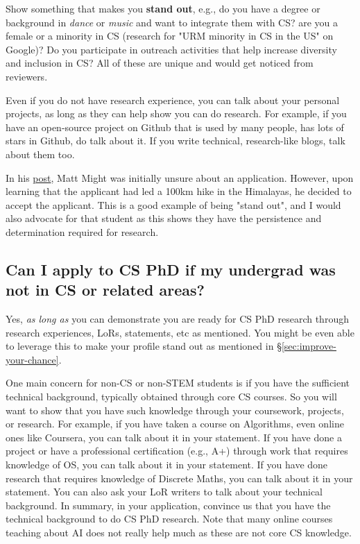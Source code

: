 \documentclass[11pt]{article}
\begin{document}
 Show something that makes you \textbf{stand out}, e.g., do you have a degree or background in \emph{dance} or \emph{music} and want to integrate them with CS? are you a female or a minority in CS (research for "URM minority in CS in the US" on Google)? Do you participate in outreach activities that help increase diversity and inclusion in CS? All of these are unique and would get noticed from reviewers. 
    
Even if you do not have research experience, you can talk about your personal projects, as long as they can help show you can do research. For example, if you have an open-source project on Github that is used by many people, has lots of stars in Github, do talk about it. If you write technical, research-like blogs, talk about them too.


In his \href{https://matt.might.net/articles/how-to-apply-and-get-in-to-graduate-school-in-science-mathematics-engineering-or-computer-science/}{post}, Matt Might was initially unsure about an application. However, upon learning that the applicant had led a 100km hike in the Himalayas, he decided to accept the applicant.  This is a good example of being "stand out", and I would also advocate for that student as this shows they have the persistence and determination required for research.




\subsection{Can I apply to CS PhD if my undergrad was not in CS or related areas?}\label{sec:non-stem}

Yes, \emph{as long as} you can demonstrate you are ready for CS PhD research through research experiences, LoRs, statements, etc as mentioned. You might be even able to leverage this to make your profile stand out as mentioned in \S\ref{sec:improve-your-chance}. 

One main concern for non-CS or non-STEM students is if you have the sufficient technical background, typically obtained through core CS courses.  So you will want to show that you have such knowledge through your coursework, projects, or research. 
For example, if you have taken a course on Algorithms, even online ones like Coursera, you can talk about it in your statement.  If you have done a project or have a professional certification (e.g., A+) through work that requires knowledge of OS, you can talk about it in your statement.  If you have done research that requires knowledge of Discrete Maths, you can talk about it in your statement.  You can also ask your LoR writers to talk about your technical background.  
In summary, in your application, convince us that you have the technical background to do CS PhD research. 
Note that many online courses teaching about AI does not really help much as these are not core CS knowledge.
\end{document}
